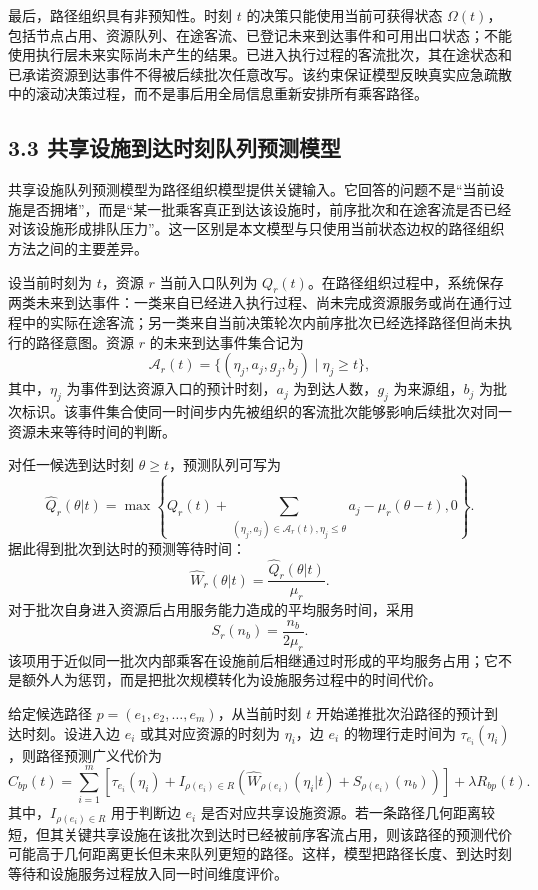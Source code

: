 \documentclass[UTF8,a4paper,12pt]{ctexart}
\begin{document}
最后，路径组织具有非预知性。时刻 \(t\) 的决策只能使用当前可获得状态 \(\Omega(t)\)，包括节点占用、资源队列、在途客流、已登记未来到达事件和可用出口状态；不能使用执行层未来实际尚未产生的结果。已进入执行过程的客流批次，其在途状态和已承诺资源到达事件不得被后续批次任意改写。该约束保证模型反映真实应急疏散中的滚动决策过程，而不是事后用全局信息重新安排所有乘客路径。

\subsection{3.3 共享设施到达时刻队列预测模型}

共享设施队列预测模型为路径组织模型提供关键输入。它回答的问题不是“当前设施是否拥堵”，而是“某一批乘客真正到达该设施时，前序批次和在途客流是否已经对该设施形成排队压力”。这一区别是本文模型与只使用当前状态边权的路径组织方法之间的主要差异。

设当前时刻为 \(t\)，资源 \(r\) 当前入口队列为 \(Q_r(t)\)。在路径组织过程中，系统保存两类未来到达事件：一类来自已经进入执行过程、尚未完成资源服务或尚在通行过程中的实际在途客流；另一类来自当前决策轮次内前序批次已经选择路径但尚未执行的路径意图。资源 \(r\) 的未来到达事件集合记为
\[
\mathcal A_r(t)=\{(\eta_j,a_j,g_j,b_j)\mid \eta_j\geq t\},
\]
其中，\(\eta_j\) 为事件到达资源入口的预计时刻，\(a_j\) 为到达人数，\(g_j\) 为来源组，\(b_j\) 为批次标识。该事件集合使同一时间步内先被组织的客流批次能够影响后续批次对同一资源未来等待时间的判断。

对任一候选到达时刻 \(\theta\geq t\)，预测队列可写为
\[
\widehat Q_r(\theta|t)=
\max\left\{
Q_r(t)+\sum_{(\eta_j,a_j)\in\mathcal A_r(t),\eta_j\leq \theta}a_j
-\mu_r(\theta-t),0
\right\}.
\]
据此得到批次到达时的预测等待时间：
\[
\widehat W_r(\theta|t)=\frac{\widehat Q_r(\theta|t)}{\mu_r}.
\]
对于批次自身进入资源后占用服务能力造成的平均服务时间，采用
\[
S_r(n_b)=\frac{n_b}{2\mu_r}.
\]
该项用于近似同一批次内部乘客在设施前后相继通过时形成的平均服务占用；它不是额外人为惩罚，而是把批次规模转化为设施服务过程中的时间代价。

给定候选路径 \(p=(e_1,e_2,\ldots,e_m)\)，从当前时刻 \(t\) 开始递推批次沿路径的预计到达时刻。设进入边 \(e_i\) 或其对应资源的时刻为 \(\eta_i\)，边 \(e_i\) 的物理行走时间为 \(\tau_{e_i}(\eta_i)\)，则路径预测广义代价为
\[
\widehat C_{bp}(t)=
\sum_{i=1}^{m}
\left[
\tau_{e_i}(\eta_i)+
I_{\rho(e_i)\in R}
\left(
\widehat W_{\rho(e_i)}(\eta_i|t)+S_{\rho(e_i)}(n_b)
\right)
\right]+
\lambda R_{bp}(t).
\]
其中，\(I_{\rho(e_i)\in R}\) 用于判断边 \(e_i\) 是否对应共享设施资源。若一条路径几何距离较短，但其关键共享设施在该批次到达时已经被前序客流占用，则该路径的预测代价可能高于几何距离更长但未来队列更短的路径。这样，模型把路径长度、到达时刻等待和设施服务过程放入同一时间维度评价。
\end{document}
